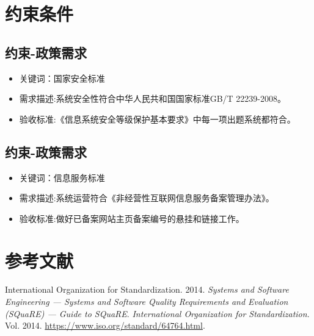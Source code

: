 \documentclass[hyperref, a4paper]{ctexart}
\providecommand{\tightlist}{%
  \setlength{\itemsep}{0pt}\setlength{\parskip}{0pt}}
\begin{document}
\hypertarget{ux7ea6ux675fux6761ux4ef6}{%
\section{约束条件}\label{ux7ea6ux675fux6761ux4ef6}}

\hypertarget{ux7ea6ux675f-ux653fux7b56ux9700ux6c42}{%
\subsection{约束-政策需求}\label{ux7ea6ux675f-ux653fux7b56ux9700ux6c42}}

\begin{itemize}
\tightlist
\item
  关键词：国家安全标准
\item
  需求描述:系统安全性符合中华人民共和国国家标准GB/T 22239-2008。
\item
  验收标准:《信息系统安全等级保护基本要求》中每一项出题系统都符合。
\end{itemize}

\hypertarget{ux7ea6ux675f-ux653fux7b56ux9700ux6c42-1}{%
\subsection{约束-政策需求}\label{ux7ea6ux675f-ux653fux7b56ux9700ux6c42-1}}

\begin{itemize}
\tightlist
\item
  关键词：信息服务标准
\item
  需求描述:系统运营符合《非经营性互联网信息服务备案管理办法》。
\item
  验收标准:做好已备案网站主页备案编号的悬挂和链接工作。
\end{itemize}

\pagebreak

\hypertarget{ux53c2ux8003ux6587ux732e}{%
\section*{参考文献}\label{ux53c2ux8003ux6587ux732e}}

\hypertarget{refs}{}
\leavevmode\hypertarget{ref-innovativeInternationalisation}{}%
International Organization for Standardization. 2014. \emph{Systems and
Software Engineering --- Systems and Software Quality Requirements and
Evaluation (SQuaRE) --- Guide to SQuaRE}. \emph{International
Organization for Standardization}. Vol. 2014.
\url{https://www.iso.org/standard/64764.html}.
\end{document}
